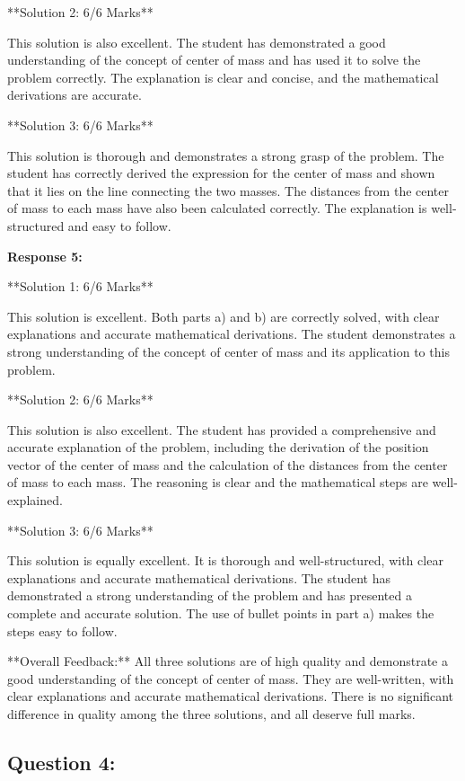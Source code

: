 \documentclass[a4paper,11pt]{article}
\begin{document}
**Solution 2: 6/6 Marks**

This solution is also excellent. The student has demonstrated a good understanding of the concept of center of mass and has used it to solve the problem correctly. The explanation is clear and concise, and the mathematical derivations are accurate.

**Solution 3: 6/6 Marks**

This solution is thorough and demonstrates a strong grasp of the problem. The student has correctly derived the expression for the center of mass and shown that it lies on the line connecting the two masses. The distances from the center of mass to each mass have also been calculated correctly. The explanation is well-structured and easy to follow. 

\textbf{Response 5:}

**Solution 1: 6/6 Marks**

This solution is excellent. Both parts a) and b) are correctly solved, with clear explanations and accurate mathematical derivations. The student demonstrates a strong understanding of the concept of center of mass and its application to this problem.

**Solution 2: 6/6 Marks**

This solution is also excellent. The student has provided a comprehensive and accurate explanation of the problem, including the derivation of the position vector of the center of mass and the calculation of the distances from the center of mass to each mass. The reasoning is clear and the mathematical steps are well-explained.

**Solution 3: 6/6 Marks**

This solution is equally excellent. It is thorough and well-structured, with clear explanations and accurate mathematical derivations. The student has demonstrated a strong understanding of the problem and has presented a complete and accurate solution. The use of bullet points in part a) makes the steps easy to follow. 

**Overall Feedback:**
All three solutions are of high quality and demonstrate a good understanding of the concept of center of mass. They are well-written, with clear explanations and accurate mathematical derivations. There is no significant difference in quality among the three solutions, and all deserve full marks.

\subsection*{Question 4:}
\end{document}
